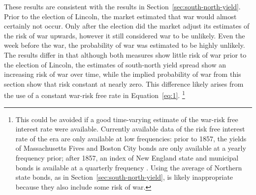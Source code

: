 \documentclass[]{article}\usepackage[]{graphicx}\usepackage[]{color}
\begin{document}
These results are consistent with the results in Section~\ref{sec:south-north-yield}.
Prior to the election of Lincoln, the market estimated that war would almost certainly not occur.
Only after the election did the market adjust its estimates of the risk of war upwards, however it still considered war to be unlikely.
Even the week before the war, the probability of war was estimated to be highly unlikely.
The results differ in that although both measures show little risk of war prior to the election of Lincoln, the estimates of south-north yield spread show an increasing risk of war over time, while the implied probability of war from this section show that risk constant at nearly zero.
This difference likely arises from the use of a constant war-risk free rate in Equation~\eqref{eq:1}.%
\footnote{
  This could be avoided if a good time-varying estimate of the war-risk free interest rate were available.
  Currently available data of the risk free interest rate of the era are only available at low frequencies: prior to 1857, the yields of Massachusetts Fives and Boston City bonds are only available at a yearly frequency prior; after 1857, an index of New England state and municipal bonds is available at a quarterly frequency \parencite{Officer2003}.
  Using the average of Northern state bonds, as in Section~\ref{sec:south-north-yield}, is likely inappropriate because they also include some risk of war.
}
\end{document}
